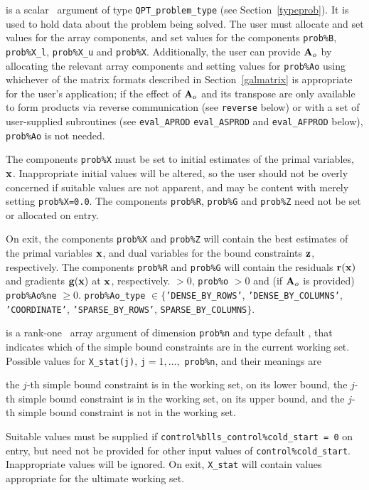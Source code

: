 \documentclass{galahad}
\begin{document}
\vspace*{-3mm}
\begin{description}
 is a scalar \intentinout\ argument of type
{\tt QPT\_problem\_type}
(see Section~\ref{typeprob}).
It is used to hold data about the problem being solved.
The user must allocate and set values for the array components,
and set values for the components
{\tt prob\%B}, {\tt prob\%X\_l}, {\tt prob\%X\_u} and {\tt prob\%X}.
Additionally, the user can provide ${\mathbf{A}}_o$ by allocating the
relevant array components and setting values for {\tt prob\%Ao}
using whichever
of the matrix formats described in Section~\ref{galmatrix}
is appropriate for the user's application;
if the effect of ${\mathbf{A}}_o$ and its transpose are only available to form products
via reverse communication (see {\tt reverse} below)
or with a set of user-supplied subroutines (see {\tt eval\_APROD}
{\tt eval\_ASPROD} and {\tt eval\_AFPROD} below), {\tt prob\%Ao} is not needed.

The components {\tt prob\%X}
must be set to initial estimates of the primal variables, ${\mathbf{x}}$.
Inappropriate initial values will be altered, so the user should
not be overly concerned if suitable values are not apparent, and may be
content with merely setting {\tt prob\%X=0.0}.
The components {\tt prob\%R}, {\tt prob\%G} and {\tt prob\%Z}
need not be set or allocated on entry.

On exit, the components {\tt prob\%X} and {\tt prob\%Z}
will contain the best estimates of the primal variables ${\mathbf{x}}$,
and dual variables for the bound constraints ${\mathbf{z}}$, respectively.
The components {\tt prob\%R} and {\tt prob\%G}
will contain the residuals ${\mathbf{r}}({\mathbf{x}})$
and gradients ${\mathbf{g}}({\mathbf{x}})$ at ${\mathbf{x}}$, respectively.
 $> 0$, {\tt prob\%o} $> 0$
              and (if ${\mathbf{A}}_o$ is provided) {\tt prob\%Ao\%ne} $\geq 0$.
{\tt prob\%Ao\_type} $\in \{${\tt 'DENSE\_BY\_ROWS'}, 
{\tt 'DENSE\_BY\_COLUMNS'}, {\tt 'COORDINATE'}, 
{\tt 'SPARSE\_BY\_\-ROWS'}, {\tt SPARSE\_BY\_COLUMNS}$\}$.

 is a rank-one \intentinout\ array argument of dimension {\tt prob\%n}
and type default \integer, that indicates which of the simple bound
constraints are in the current working set. Possible values for
{\tt X\_stat(j)}, {\tt j}$=1, \ldots ,$ {\tt prob\%n}, and their meanings are
\begin{description}
 the $j$-th simple bound constraint
is in the working set, on its lower bound,
 the $j$-th simple bound constraint
is in the working set, on its upper bound, and
  the $j$-th simple bound constraint is not in the working set.
\end{description}
Suitable values must be supplied if
{\tt control\%blls\_control\%cold\_start = 0} on entry,
but need not be provided for other input values of {\tt control\%cold\_start}.
Inappropriate values will be ignored.
On exit, {\tt X\_stat} will contain values appropriate for the ultimate
working set.


\end{description}
\end{document}
